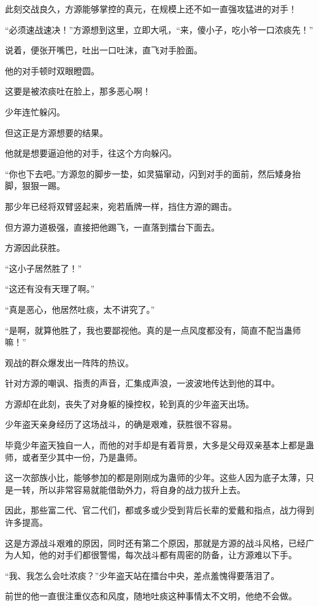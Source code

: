 \begin{this_body}
此刻交战良久，方源能够掌控的真元，在规模上还不如一直强攻猛进的对手！

“必须速战速决！”方源想到这里，立即大吼，“来，傻小子，吃小爷一口浓痰先！”

说着，便张开嘴巴，吐出一口吐沫，直飞对手脸面。

他的对手顿时双眼瞪圆。

这要是被浓痰吐在脸上，那多恶心啊！

少年连忙躲闪。

但这正是方源想要的结果。

他就是想要逼迫他的对手，往这个方向躲闪。

“你也下去吧。”方源忽的脚步一垫，如灵猫窜动，闪到对手的面前，然后矮身抬脚，狠狠一踢。

那少年已经将双臂竖起来，宛若盾牌一样，挡住方源的踢击。

但方源力道极强，直接把他踢飞，一直落到擂台下面去。

方源因此获胜。

“这小子居然胜了！”

“这还有没有天理了啊。”

“真是恶心，他居然吐痰，太不讲究了。”

“是啊，就算他胜了，我也要鄙视他。真的是一点风度都没有，简直不配当蛊师嘛！”

观战的群众爆发出一阵阵的热议。

针对方源的嘲讽、指责的声音，汇集成声浪，一波波地传达到他的耳中。

方源却在此刻，丧失了对身躯的操控权，轮到真的少年盗天出场。

少年盗天亲身经历了这场战斗，的确是艰难，获胜很不容易。

毕竟少年盗天独自一人，而他的对手却是有着背景，大多是父母双亲基本上都是蛊师，或者至少其中一份，乃是蛊师。

这一次部族小比，能够参加的都是刚刚成为蛊师的少年。这些人因为底子太薄，只是一转，所以非常容易就能借助外力，将自身的战力拔升上去。

因此，那些富二代、官二代们，都或多或少受到背后长辈的爱戴和指点，战力得到许多提高。

这是方源战斗艰难的原因，同时还有第二个原因，那就是方源的战斗风格，已经广为人知，他的对手们都很警惕，每次战斗都有周密的防备，让方源难以下手。

“我、我怎么会吐浓痰？”少年盗天站在擂台中央，差点羞愧得要落泪了。

前世的他一直很注重仪态和风度，随地吐痰这种事情太不文明，他绝不会做。


\end{this_body}
